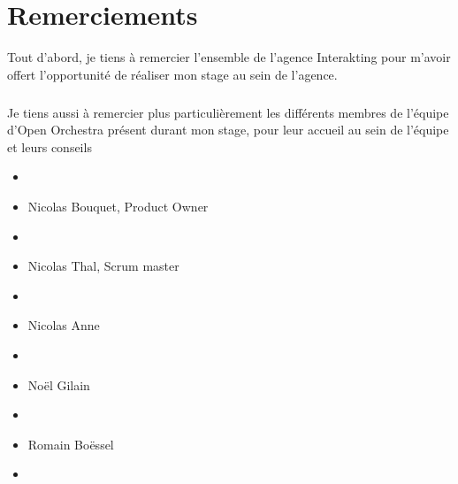 \chapter*{Remerciements}
Tout d'abord, je tiens à remercier l'ensemble de l'agence Interakting pour m'avoir offert l'opportunité de réaliser mon stage au sein de l'agence.
\paragraph{}
Je tiens aussi à remercier plus particulièrement les différents membres de l'équipe d'Open Orchestra présent durant mon stage, pour leur accueil au sein de l'équipe et leurs conseils

\begin{itemize}
\item[]
\item Nicolas Bouquet, Product Owner
\item[]
\item Nicolas Thal, Scrum master
\item[]
\item Nicolas Anne 
\item[]
\item Noël Gilain
\item[]
\item Romain Boëssel
\item[]
\end{itemize}